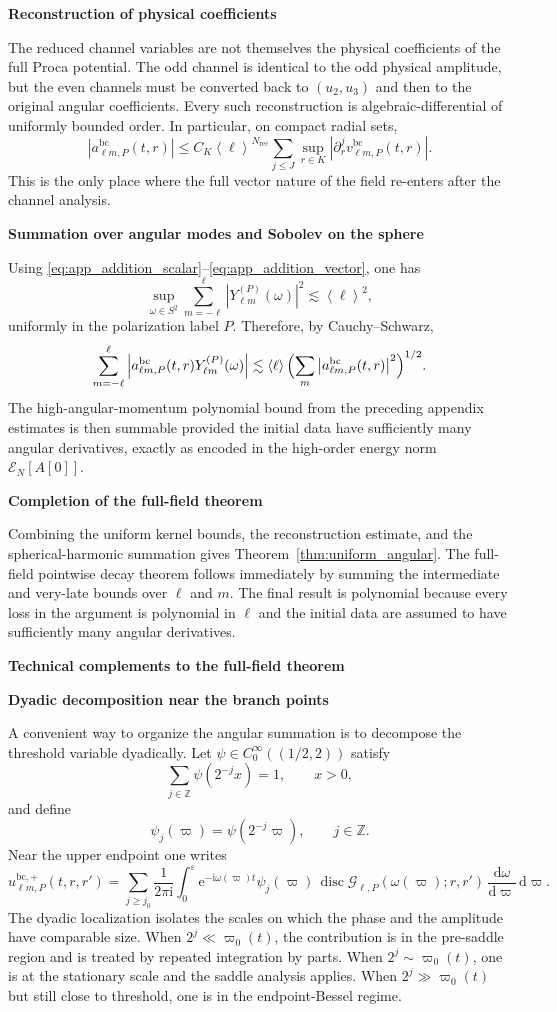 \documentclass[12pt]{article}
\numberwithin{equation}{section}
\theoremstyle{plain}
\theoremstyle{definition}
\theoremstyle{remark}
\newcommand{\Z}{\mathbb Z}
\newcommand{\ii}{\mathrm i}
\newcommand{\ee}{\mathrm e}
\newcommand{\dd}{\mathrm d}
\newcommand{\disc}{\operatorname{disc}}
\newcommand{\bc}{\mathrm{bc}}
\newcommand{\cG}{\mathcal G}
\newcommand{\om}{\omega}
\newcommand{\vp}{\varpi}
\newcommand{\eps}{\varepsilon}
\newcommand{\angles}[1]{\left\langle #1 \right\rangle}
\newcommand{\abs}[1]{\left|#1\right|}
\newcommand{\appheading}[1]{\par\medskip\noindent\textbf{#1}\par\smallskip\noindent}
\newcommand{\applabelheading}[2]{\par\medskip\phantomsection\label{#2}\noindent\textbf{#1}\par\smallskip\noindent}
\begin{document}
\appheading{Reconstruction of physical coefficients}

The reduced channel variables are not themselves the physical coefficients of the full Proca potential.  The odd channel is identical to the odd physical amplitude, but the even channels must be converted back to $(u_2,u_3)$ and then to the original angular coefficients.  Every such reconstruction is algebraic-differential of uniformly bounded order.  In particular, on compact radial sets,
\[
   \abs{a_{\ell m,P}^{\bc}(t,r)}
   \le C_K\angles{\ell}^{N_{\mathrm{rec}}}
   \sum_{j\le J}
      \sup_{r\in K}\abs{\partial_r^j v_{\ell m,P}^{\bc}(t,r)}.
\]
This is the only place where the full vector nature of the field re-enters after the channel analysis.

\appheading{Summation over angular modes and Sobolev on the sphere}

Using \eqref{eq:app_addition_scalar}--\eqref{eq:app_addition_vector}, one has
\[
   \sup_{\omega\in S^2}
   \sum_{m=-\ell}^{\ell}\abs{Y_{\ell m}^{(P)}(\omega)}^2
   \lesssim \angles{\ell}^{2},
\]
uniformly in the polarization label $P$.  Therefore, by Cauchy--Schwarz,
\[
   \sum_{m=-\ell}^{\ell}
      \abs{a_{\ell m,P}^{\bc}(t,r)Y_{\ell m}^{(P)}(\omega)}
   \lesssim
   \angles{\ell}
   \Bigl(\sum_m \abs{a_{\ell m,P}^{\bc}(t,r)}^2\Bigr)^{1/2}.
\]
The high-angular-momentum polynomial bound from the preceding appendix estimates is then summable provided the initial data have sufficiently many angular derivatives, exactly as encoded in the high-order energy norm $\mathcal E_N[A[0]]$.

\appheading{Completion of the full-field theorem}

Combining the uniform kernel bounds, the reconstruction estimate, and the spherical-harmonic summation gives Theorem~\ref{thm:uniform_angular}.  The full-field pointwise decay theorem follows immediately by summing the intermediate and very-late bounds over $\ell$ and $m$.  The final result is polynomial because every loss in the argument is polynomial in $\ell$ and the initial data are assumed to have sufficiently many angular derivatives.

\applabelheading{Technical complements to the full-field theorem}{app:tech_fullfield}
\appheading{Dyadic decomposition near the branch points}

A convenient way to organize the angular summation is to decompose the threshold variable dyadically.  Let $\psi\in C_0^\infty((1/2,2))$ satisfy
\[
   \sum_{j\in\Z}\psi(2^{-j}x)=1,\qquad x>0,
\]
and define
\[
   \psi_j(\vp)=\psi(2^{-j}\vp),\qquad j\in\Z.
\]
Near the upper endpoint one writes
\[
   u_{\ell m,P}^{\bc,+}(t,r,r')
   =
   \sum_{j\ge j_0}
   \frac{1}{2\pi\ii}
   \int_0^{\eps}
      \ee^{-\ii\om(\vp)t}
      \psi_j(\vp)\,
      \disc\cG_{\ell,P}(\om(\vp);r,r')
      \,\frac{\dd\om}{\dd\vp}\,\dd\vp.
\]
The dyadic localization isolates the scales on which the phase and the amplitude have comparable size.  When $2^j\ll \vp_0(t)$, the contribution is in the pre-saddle region and is treated by repeated integration by parts.  When $2^j\sim \vp_0(t)$, one is at the stationary scale and the saddle analysis applies.  When $2^j\gg \vp_0(t)$ but still close to threshold, one is in the endpoint-Bessel regime.
\end{document}
